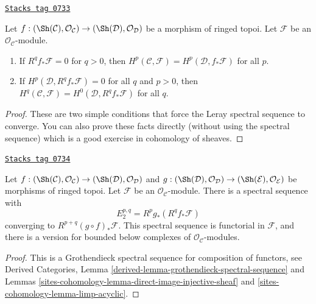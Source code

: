 \begin{lemma}
\label{sites-cohomology-lemma-apply-Leray}
\href{https://stacks.math.columbia.edu/tag/0733}{\texttt{Stacks tag 0733}}

Let $f : (\Sh(\mathcal{C}), \mathcal{O}_\mathcal{C}) \to
(\Sh(\mathcal{D}), \mathcal{O}_\mathcal{D})$ be a morphism of ringed topoi.
Let $\mathcal{F}$ be an $\mathcal{O}_\mathcal{C}$-module.
\begin{enumerate}
\item If $R^qf_*\mathcal{F} = 0$ for $q > 0$, then
$H^p(\mathcal{C}, \mathcal{F}) = H^p(\mathcal{D}, f_*\mathcal{F})$ for all $p$.
\item If $H^p(\mathcal{D}, R^qf_*\mathcal{F}) = 0$ for all $q$ and $p > 0$,
then $H^q(\mathcal{C}, \mathcal{F}) = H^0(\mathcal{D}, R^qf_*\mathcal{F})$
for all $q$.
\end{enumerate}
\end{lemma}

\begin{proof}
These are two simple conditions that force the Leray spectral sequence to
converge. You can also prove these facts directly (without using the
spectral sequence) which is a good exercise in cohomology of sheaves.
\end{proof}

\begin{lemma}

\label{sites-cohomology-lemma-relative-Leray}
\href{https://stacks.math.columbia.edu/tag/0734}{\texttt{Stacks tag 0734}}

Let
$f : (\Sh(\mathcal{C}), \mathcal{O}_\mathcal{C}) \to
(\Sh(\mathcal{D}), \mathcal{O}_\mathcal{D})$
and
$g : (\Sh(\mathcal{D}), \mathcal{O}_\mathcal{D}) \to
(\Sh(\mathcal{E}), \mathcal{O}_\mathcal{E})$
be morphisms of ringed topoi.
Let $\mathcal{F}$ be an $\mathcal{O}_\mathcal{C}$-module.
There is a spectral sequence with
$$
E_2^{p, q} = R^pg_*(R^qf_*\mathcal{F})
$$
converging to $R^{p + q}(g \circ f)_*\mathcal{F}$.
This spectral sequence is functorial in $\mathcal{F}$, and there
is a version for bounded below complexes of $\mathcal{O}_\mathcal{C}$-modules.
\end{lemma}

\begin{proof}
This is a Grothendieck spectral sequence for composition of functors, see
Derived Categories, Lemma \ref{derived-lemma-grothendieck-spectral-sequence}
and
Lemmas \ref{sites-cohomology-lemma-direct-image-injective-sheaf} and
\ref{sites-cohomology-lemma-limp-acyclic}.
\end{proof}

